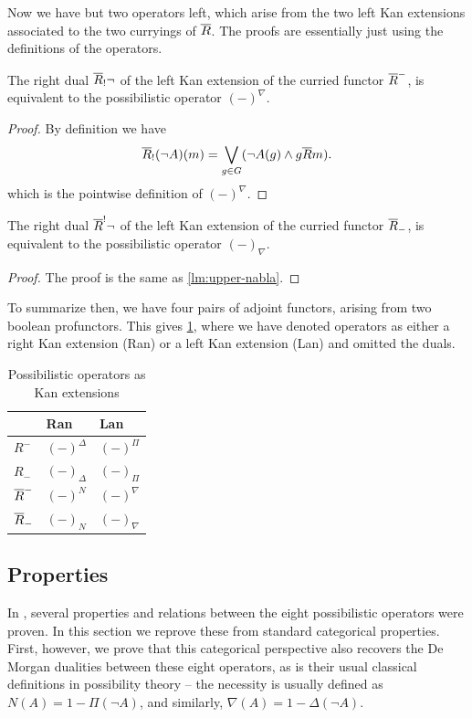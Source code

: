 Now we have but two operators left, which arise from the two left Kan extensions associated to the two curryings of $\overline{R}$. The proofs are essentially just using the definitions of the operators. 

\begin{lemma}
    \label{lm:upper-nabla}
    The right dual $\overline{R}_!\neg$ of the left Kan extension of the curried functor $\overline{R}^-$, is equivalent to the possibilistic operator $(-)^\nabla$.
\end{lemma}
\begin{proof}
    By definition we have 
    \[\overline{R}_!(\neg A)(m)=\bigvee_{g\in G} (\neg A(g)\wedge g\overline{R} m).\]
    which is the pointwise definition of $(-)^\nabla$.   
\end{proof}

\begin{lemma}
    \label{lm:lower-nabla}
    The right dual $\overline{R}^!\neg$ of the left Kan extension of the curried functor $\overline{R}_-$, is equivalent to the possibilistic operator $(-)_\nabla$.
\end{lemma}
\begin{proof}
    The proof is the same as \cref{lm:upper-nabla}. 
\end{proof}

To summarize then, we have four pairs of adjoint functors, arising from two boolean profunctors. This gives \cref{tab:lan-ran}, where we have denoted operators as either a right Kan extension (Ran) or a left Kan extension (Lan) and omitted the duals. 

\begin{table}[ht]
\centering
\begin{tabular}{l|ll}
& Ran & Lan\\
\hline
$R^-$   & $(-)^\Delta$ & $(-)^\Pi$ \\
$R_-$   & $(-)_\Delta$ & $(-)_\Pi$  \\
$\overline{R}^-$ & $(-)^N$      &  $(-)^\nabla$ \\
$\overline{R}_-$ & $(-)_N$    & $(-)_\nabla$
\end{tabular}
\caption{Possibilistic operators as Kan extensions}
\label{tab:lan-ran}
\end{table}



\subsection{Properties}

In \cite{djouadi_prade_2011}, several properties and relations between the eight possibilistic operators were proven. In this section we reprove these from standard categorical properties. First, however, we prove that this categorical perspective also recovers the De Morgan dualities between these eight operators, as is their usual classical definitions in possibility theory -- the necessity is usually defined as $N(A) = 1-\Pi(\neg A)$, and similarly, $\nabla(A)=1-\Delta(\neg A)$. 

